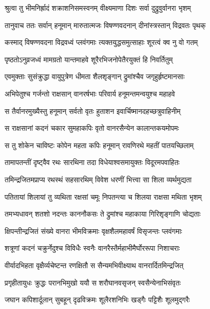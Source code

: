 
\twolineshloka
{श्रुत्वा तु भीमनिर्ह्रादं शक्राशनिसमस्वनम्}
{वीक्ष्यमाणा दिशः सर्वा दुद्रुवुर्वानरा भृशम्} %

\twolineshloka
{तानुवाच ततः सर्वान् हनूमान् मारुतात्मजः}
{विषण्णवदनान् दीनांस्त्रस्तान् विद्रवतः पृथक्} %

\twolineshloka
{कस्माद् विषण्णवदना विद्रवध्वं प्लवंगमाः}
{त्यक्तयुद्धसमुत्साहाः शूरत्वं क्व नु वो गतम्} %

\twolineshloka
{पृष्ठतोऽनुव्रजध्वं मामग्रतो यान्तमाहवे}
{शूरैरभिजनोपेतैरयुक्तं हि निवर्तितुम्} %

\twolineshloka
{एवमुक्ताः सुसंक्रुद्धा वायुपुत्रेण धीमता}
{शैलशृङ्गान् द्रुमांश्चैव जगृहुर्हृष्टमानसाः} %

\twolineshloka
{अभिपेतुश्च गर्जन्तो राक्षसान् वानरर्षभाः}
{परिवार्य हनूमन्तमन्वयुश्च महाहवे} %

\twolineshloka
{स तैर्वानरमुख्यैस्तु हनूमान् सर्वतो वृतः}
{हुताशन इवार्चिष्मानदहच्छत्रुवाहिनीम्} %

\twolineshloka
{स राक्षसानां कदनं चकार सुमहाकपिः}
{वृतो वानरसैन्येन कालान्तकयमोपमः} %

\twolineshloka
{स तु शोकेन चाविष्टः कोपेन महता कपिः}
{हनूमान् रावणिरथे महतीं पातयच्छिलाम्} %

\twolineshloka
{तामापतन्तीं दृष्ट्वैव रथः सारथिना तदा}
{विधेयाश्वसमायुक्तः विदूरमपवाहितः} %

\twolineshloka
{तमिन्द्रजितमप्राप्य रथस्थं सहसारथिम्}
{विवेश धरणीं भित्त्वा सा शिला व्यर्थमुद्यता} %

\twolineshloka
{पतितायां शिलायां तु व्यथिता रक्षसां चमूः}
{निपतन्त्या च शिलया राक्षसा मथिता भृशम्} %

\twolineshloka
{तमभ्यधावन् शतशो नदन्तः काननौकसः}
{ते द्रुमांश्च महाकाया गिरिशृङ्गाणि चोद्यताः} %

\twolineshloka
{क्षिपन्तीन्द्रजितं संख्ये वानरा भीमविक्रमाः}
{वृक्षशैलमहावर्षं विसृजन्तः प्लवंगमाः} %

\twolineshloka
{शत्रूणां कदनं चक्रुर्नेदुश्च विविधैः स्वनैः}
{वानरैस्तैर्महाभीमैर्घोररूपा निशाचराः} %

\twolineshloka
{वीर्यादभिहता वृक्षैर्व्यचेष्टन्त रणक्षितौ}
{स सैन्यमभिवीक्ष्याथ वानरार्दितमिन्द्रजित्} %

\twolineshloka
{प्रगृहीतायुधः क्रुद्धः परानभिमुखो ययौ}
{स शरौघानवसृजन् स्वसैन्येनाभिसंवृतः} %

\twolineshloka
{जघान कपिशार्दूलान् सुबहून् दृढविक्रमः}
{शूलैरशनिभिः खड्गैः पट्टिशैः शूलमुद्गरैः} %

